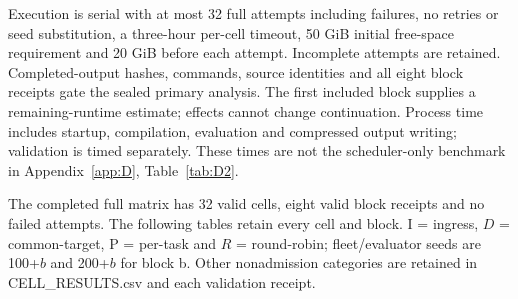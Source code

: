 \documentclass[12pt,a4paper]{article}
\begin{document}
Execution is serial with at most 32 full attempts including failures, no retries or seed substitution, a three-hour per-cell timeout, 50 GiB initial free-space requirement and 20 GiB before each attempt. Incomplete attempts are retained. Completed-output hashes, commands, source identities and all eight block receipts gate the sealed primary analysis. The first included block supplies a remaining-runtime estimate; effects cannot change continuation. Process time includes startup, compilation, evaluation and compressed output writing; validation is timed separately. These times are not the scheduler-only benchmark in Appendix~\ref{app:D}, Table~\ref{tab:D2}.

The completed full matrix has 32 valid cells, eight valid block receipts and no failed attempts. The following tables retain every cell and block. I = ingress, $D$ = common-target, P = per-task and $R$ = round-robin; fleet/evaluator seeds are 100+$b$ and 200+$b$ for block b. Other nonadmission categories are retained in CELL\_RESULTS.csv and each validation receipt.
\end{document}
